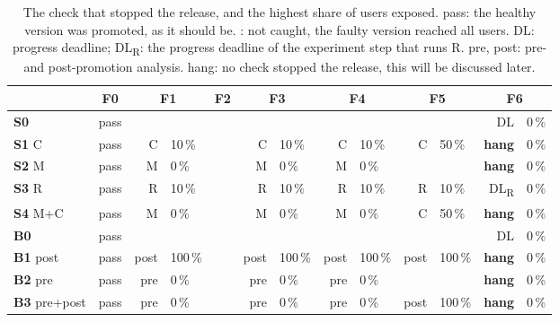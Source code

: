 \begin{table}[ht]
	\scriptsize
	\centering
	\setlength{\tabcolsep}{6pt}
	\begin{tabular}{ l c *{6}{r@{\ ·\ }l} }
		\toprule
		& F0 & \multicolumn{2}{c}{F1} & \multicolumn{2}{c}{F2} & \multicolumn{2}{c}{F3} & \multicolumn{2}{c}{F4} & \multicolumn{2}{c}{F5} & \multicolumn{2}{c}{F6} \\
		\midrule
		\textbf{S0} & pass & \multicolumn{2}{c}{\miss} & \multicolumn{2}{c}{\miss} & \multicolumn{2}{c}{\miss} & \multicolumn{2}{c}{\miss} & \multicolumn{2}{c}{\miss} & DL & 0\,\% \\
		\textbf{S1} C & pass & C & 10\,\% & \multicolumn{2}{c}{\miss} & C & 10\,\% & C & 10\,\% & C & 50\,\% & \textbf{hang} & 0\,\% \\
		\textbf{S2} M & pass & M & 0\,\% & \multicolumn{2}{c}{\miss} & M & 0\,\% & M & 0\,\% & \multicolumn{2}{c}{\miss} & \textbf{hang} & 0\,\% \\
		\textbf{S3} R & pass & R & 10\,\% & \multicolumn{2}{c}{\miss} & R & 10\,\% & R & 10\,\% & R & 10\,\% & DL\textsubscript{R} & 0\,\% \\
		\textbf{S4} M+C & pass & M & 0\,\% & \multicolumn{2}{c}{\miss} & M & 0\,\% & M & 0\,\% & C & 50\,\% & \textbf{hang} & 0\,\% \\
		\midrule
		\textbf{B0} & pass & \multicolumn{2}{c}{\miss} & \multicolumn{2}{c}{\miss} & \multicolumn{2}{c}{\miss} & \multicolumn{2}{c}{\miss} & \multicolumn{2}{c}{\miss} & DL & 0\,\% \\
		\textbf{B1} post & pass & post & 100\,\% & \multicolumn{2}{c}{\miss} & post & 100\,\% & post & 100\,\% & post & 100\,\% & \textbf{hang} & 0\,\% \\
		\textbf{B2} pre & pass & pre & 0\,\% & \multicolumn{2}{c}{\miss} & pre & 0\,\% & pre & 0\,\% & \multicolumn{2}{c}{\miss} & \textbf{hang} & 0\,\% \\
		\textbf{B3} pre+post & pass & pre & 0\,\% & \multicolumn{2}{c}{\miss} & pre & 0\,\% & pre & 0\,\% & post & 100\,\% & \textbf{hang} & 0\,\% \\
		\bottomrule
	\end{tabular}
	\caption{The check that stopped the release, and the highest share of users exposed. pass: the healthy version was promoted, as it should be. \miss: not caught, the faulty version reached all users. DL: progress deadline; DL\textsubscript{R}: the progress deadline of the experiment step that runs R. pre, post: pre- and post-promotion analysis. hang: no check stopped the release, this will be discussed later.}
	\label{tab:EvalDetection}
\end{table}

